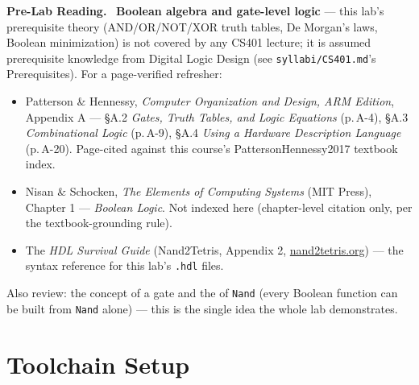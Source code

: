 \documentclass[11pt]{article}
\newenvironment{tocitebox}{%
  \par\noindent\textbf{\textcolor{primary-gold}{Pre-Lab Reading.}}\
}{\par\vspace{0.3em}}
\begin{document}
\begin{tocitebox}
\textbf{Boolean algebra and gate-level logic} --- this lab's prerequisite theory (AND/OR/NOT/XOR truth tables, De Morgan's laws, Boolean minimization) is not covered by any CS401 lecture; it is assumed prerequisite knowledge from Digital Logic Design (see \texttt{syllabi/CS401.md}'s Prerequisites). For a page-verified refresher:
\begin{itemize}
  \item Patterson \& Hennessy, \emph{Computer Organization and Design, ARM Edition}, Appendix A --- \S A.2 \emph{Gates, Truth Tables, and Logic Equations} (p.\,A-4), \S A.3 \emph{Combinational Logic} (p.\,A-9), \S A.4 \emph{Using a Hardware Description Language} (p.\,A-20). Page-cited against this course's PattersonHennessy2017 textbook index.
  \item Nisan \& Schocken, \emph{The Elements of Computing Systems} (MIT Press), Chapter 1 --- \emph{Boolean Logic}. Not indexed here (chapter-level citation only, per the textbook-grounding rule).
  \item The \emph{HDL Survival Guide} (Nand2Tetris, Appendix 2, \url{nand2tetris.org}) --- the syntax reference for this lab's \texttt{.hdl} files.
\end{itemize}
Also review: the concept of a  gate and the  of \texttt{Nand} (every Boolean function can be built from \texttt{Nand} alone) --- this is the single idea the whole lab demonstrates.
\end{tocitebox}

\section{Toolchain Setup}
\end{document}
